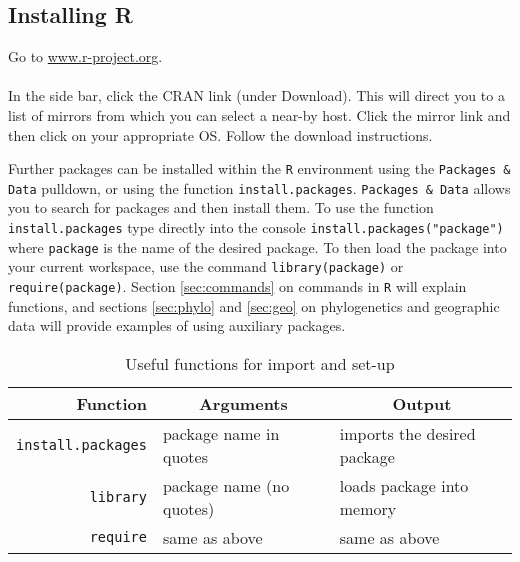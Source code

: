 \documentclass[12pt]{article}
\begin{document}
\subsection{Installing R}
Go to \href{url}{www.r-project.org}.
\\
\\
In the side bar, click the CRAN link (under Download). This will direct you to a list of mirrors from which you can select a near-by host. Click the mirror link and then click on your appropriate OS. Follow the download instructions.

Further packages can be installed within the \verb+R+ environment using the \verb+Packages &+ \verb+Data+ pulldown, or using the function \verb+install.packages+.  \verb+Packages & Data+ allows you to search for packages and then install them.  To use the function \verb+install.packages+ type directly into the console \verb+install.packages("package")+ where \verb+package+ is the name of the desired package. To then load the package into your current workspace, use the command \verb+library(package)+ or \verb+require(package)+.  Section \ref{sec:commands} on commands in \verb+R+ will explain functions, and sections \ref{sec:phylo} and \ref{sec:geo} on phylogenetics and geographic data will provide examples of using auxiliary packages.

\begin{table}[!htb]
	\caption{Useful functions for import and set-up}

	\begin{tabular}{r l l}
		\hline
		Function 	&	\multicolumn{1}{c}{Arguments}		&	\multicolumn{1}{c}{Output}		\\
		\hline
		\verb+install.packages+	&	package name in quotes		&	imports the desired package	\\
		\verb+library+			&	package name (no quotes)	&	loads package into memory	\\
		\verb+require+			&	same as above				&	same as above				\\
		\hline
	\end{tabular}
\end{table}
\end{document}
